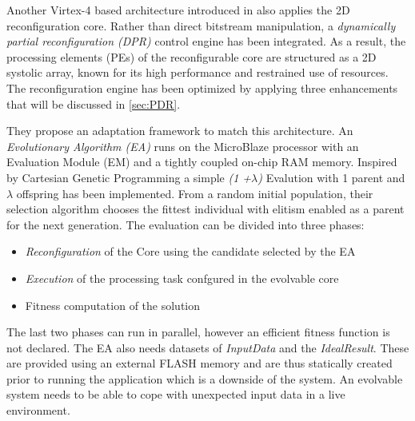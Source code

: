 
Another Virtex-4 based architecture introduced in \cite{PDR} also applies the 2D reconfiguration core. Rather than direct bitstream manipulation, a \emph{dynamically partial reconfiguration (DPR)} control engine has been integrated. As a result, the processing elements (PEs) of the reconfigurable core are structured as a 2D systolic array, known for its high performance and restrained use of resources. The reconfiguration engine has been optimized by applying three enhancements that will be discussed in \ref{sec:PDR}. 

They propose an adaptation framework to match this architecture. An \emph{Evolutionary Algorithm (EA)} runs on the MicroBlaze processor with an Evaluation Module (EM) and a tightly coupled on-chip RAM memory.  Inspired by Cartesian Genetic Programming a simple \emph{(1 +$\lambda$)} Evalution with 1 parent and $\lambda$ offspring has been implemented. From a random initial population, their selection algorithm chooses the fittest individual with elitism enabled as a parent for the next generation. The evaluation can be divided into three phases:

\begin{itemize}
	\item \emph{Reconfiguration} of the Core using the candidate selected by the EA
	\item \emph{Execution} of the processing task confgured in the evolvable core
	\item {Fitness} computation of the solution
\end{itemize}

The last two phases can run in parallel, however an efficient fitness function is not declared. The EA also needs datasets of \emph{InputData} and the \emph{IdealResult}. These are provided using an external FLASH memory and are thus statically created prior to running the application which is a downside of the system. An evolvable system needs to be able to cope with unexpected input data in a live environment.